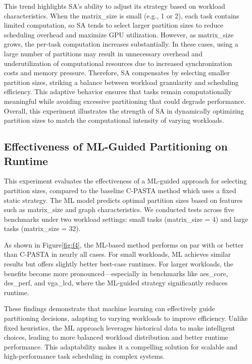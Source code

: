 \documentclass[9pt,conference]{IEEEtran}
\begin{document}
This trend highlights SA’s ability to adjust its strategy based on workload characteristics. When the matrix\_size is small (e.g., 1 or 2), each task contains limited computation, so SA tends to select larger partition sizes to reduce scheduling overhead and maximize GPU utilization. 
However, as matrix\_size grows, the per-task computation increases substantially. In these cases, using a large number of partitions may result in unnecessary overhead and underutilization of computational resources due to increased synchronization costs and memory pressure.
Therefore, SA compensates by selecting smaller partition sizes, striking a balance between workload granularity and scheduling efficiency. This adaptive behavior ensures that tasks remain computationally meaningful while avoiding excessive partitioning that could degrade performance. Overall, this experiment illustrates the strength of SA in dynamically optimizing partition sizes to match the computational intensity of varying workloads.


\subsection{Effectiveness of ML-Guided Partitioning on Runtime}


This experiment evaluates the effectiveness of a ML-guided approach for selecting partition sizes, compared to the baseline C-PASTA method which uses a fixed static strategy. The ML model predicts optimal partition sizes based on features such as matrix\_size and graph characteristics. We conducted tests across five benchmarks under two workload settings: small tasks (matrix\_size = 4) and large tasks (matrix\_size = 32).

As shown in Figure\ref{fig:f4}, the ML-based method performs on par with or better than C-PASTA in nearly all cases. For small workloads, ML achieves similar results but offers slightly better best-case runtimes. For larger workloads, the benefits become more pronounced—especially in benchmarks like aes\_core, des\_perf, and vga\_lcd, where the ML-guided strategy significantly reduces runtime.

These findings demonstrate that machine learning can effectively guide partitioning decisions, adapting to varying workloads to improve efficiency. Unlike fixed heuristics, the ML approach leverages historical data to make intelligent choices, leading to more balanced workload distribution and better runtime performance. This adaptability makes it a compelling solution for scalable and high-performance task scheduling in complex systems.
\end{document}
